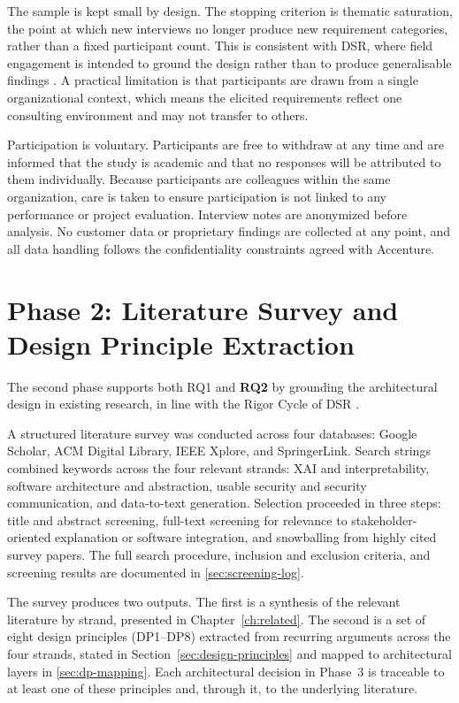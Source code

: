 The sample is kept small by design. The stopping criterion is thematic saturation, the point at which new interviews no longer produce new requirement categories, rather than a fixed participant count. This is consistent with DSR, where field engagement is intended to ground the design rather than to produce generalisable findings \cite{hevner2004dsr}. A practical limitation is that participants are drawn from a single organizational context, which means the elicited requirements reflect one consulting environment and may not transfer to others.

Participation is voluntary. Participants are free to withdraw at any time and are informed that the study is academic and that no responses will be attributed to them individually. Because participants are colleagues within the same organization, care is taken to ensure participation is not linked to any performance or project evaluation. Interview notes are anonymized before analysis. No customer data or proprietary findings are collected at any point, and all data handling follows the confidentiality constraints agreed with Accenture.

\section{Phase 2: Literature Survey and Design Principle Extraction}
\label{sec:methods-phase2}

The second phase supports both RQ1 and \textbf{RQ2} by grounding the architectural design in existing research, in line with the Rigor Cycle of DSR \cite{hevner2004dsr}.

A structured literature survey was conducted across four databases: Google Scholar, ACM Digital Library, IEEE Xplore, and SpringerLink. Search strings combined keywords across the four relevant strands: XAI and interpretability, software architecture and abstraction, usable security and security communication, and data-to-text generation. Selection proceeded in three steps: title and abstract screening, full-text screening for relevance to stakeholder-oriented explanation or software integration, and snowballing from highly cited survey papers. The full search procedure, inclusion and exclusion criteria, and screening results are documented in \cref{sec:screening-log}.

The survey produces two outputs. The first is a synthesis of the relevant literature by strand, presented in Chapter~\ref{ch:related}. The second is a set of eight design principles (DP1--DP8) extracted from recurring arguments across the four strands, stated in Section~\ref{sec:design-principles} and mapped to architectural layers in \cref{sec:dp-mapping}. Each architectural decision in Phase~3 is traceable to at least one of these principles and, through it, to the underlying literature.

